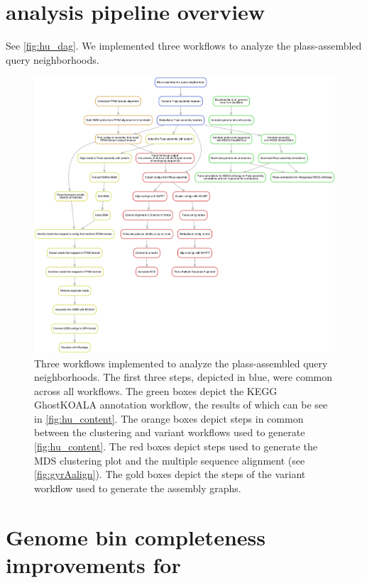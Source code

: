 \section{\hu analysis pipeline overview}


See \autoref{fig:hu_dag}. We implemented three workflows to analyze the
plass-assembled \hu query neighborhoods.


\begin{figure}
 \centering
 \includegraphics[width=\linewidth]{hu_dag}
	\caption{Three workflows implemented to analyze the plass-assembled
\hu query neighborhoods. The first three steps, depicted in blue, were common
across all workflows. The green boxes depict the KEGG GhostKOALA annotation
workflow, the results of which can be see in \autoref{fig:hu_content}.
The orange boxes depict steps in common between the clustering and variant
workflows used to generate \autoref{fig:hu_content}. The red boxes depict
steps used to generate the MDS clustering plot and the multiple sequence
alignment (see \autoref{fig:gyrAalign}). The gold boxes depict the
steps of the variant workflow used to generate the assembly graphs.
}
 \label{fig:hu_dag}
\end{figure}

\section{Genome bin completeness improvements for \hu}
\label{subsec:checkm}

